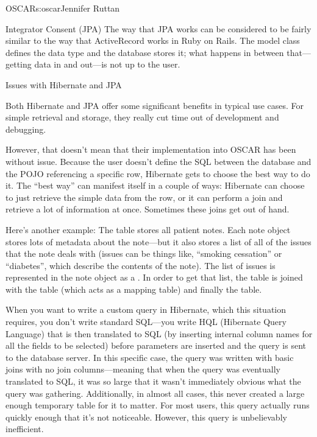\begin{aosachapter}{OSCAR}{s:oscar}{Jennifer Ruttan}
\begin{aosasect2}{Integrator Consent (JPA)}
The way that JPA works can be considered to be fairly similar to the
way that ActiveRecord works in Ruby on Rails. The model class defines
the data type and the database stores it; what happens in between
that---getting data in and out---is not up to the user.

\end{aosasect2}

\begin{aosasect2}{Issues with Hibernate and JPA}

Both Hibernate and JPA offer some significant benefits in typical use
cases. For simple retrieval and storage, they really cut time out of
development and debugging.

However, that doesn't mean that their implementation into OSCAR has
been without issue. Because the user doesn't define the SQL between
the database and the POJO referencing a specific row, Hibernate gets
to choose the best way to do it. The ``best way'' can manifest itself in a
couple of ways: Hibernate can choose to just retrieve the simple data
from the row, or it can perform a join and retrieve a lot of
information at once. Sometimes these joins get out of hand.

Here's another example: The  table
stores all patient notes. Each note object stores lots of metadata
about the note---but it also stores a list of all of the issues that
the note deals with (issues can be things like, ``smoking cessation''
or ``diabetes'', which describe the contents of the note). 
The list of issues is represented in the note object as a 
.  In order to get that list, 
the  table is joined with the  
table (which acts as a mapping table) and finally the 
 table.

When you want to write a custom query in Hibernate, which this
situation requires, you don't write standard SQL---you write HQL
(Hibernate Query Language) that is then translated to SQL (by
inserting internal column names for all the fields to be selected)
before parameters are inserted and the query is sent to the database
server. In this specific case, the query was written with basic joins
with no join columns---meaning that when the query was eventually
translated to SQL, it was so large that it wasn't immediately obvious
what the query was gathering. Additionally, in almost all cases, this
never created a large enough temporary table for it to matter.  
For most users, this query actually runs quickly enough that it's not
noticeable. However, this query is unbelievably inefficient.


\end{aosasect2}
\end{aosachapter}
